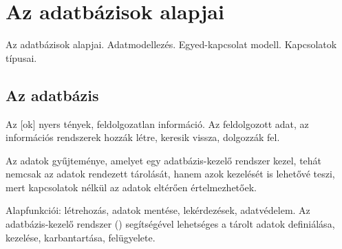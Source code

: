 \documentclass[../../main.tex]{subfiles}
\begin{document}
\section{Az adatbázisok alapjai}

\begin{fulltheorem}
  Az adatbázisok alapjai. Adatmodellezés. Egyed-kapcsolat modell. Kapcsolatok típusai.
\end{fulltheorem}

\subsection{Az adatbázis}

Az [ok] nyers tények, feldolgozatlan információ. Az
 feldolgozott adat, az információs rendszerek hozzák létre,
keresik vissza, dolgozzák fel.

Az  adatok gyűjteménye, amelyet egy adatbázis-kezelő rendszer
kezel, tehát nemcsak az adatok rendezett tárolását, hanem azok kezelését is
lehetővé teszi, mert kapcsolatok nélkül az adatok eltérően értelmezhetőek.

Alapfunkciói: létrehozás, adatok mentése, lekérdezések, adatvédelem.
Az adatbázis-kezelő rendszer () segítségével lehetséges a tárolt
adatok definiálása, kezelése, karbantartása, felügyelete.
\end{document}
